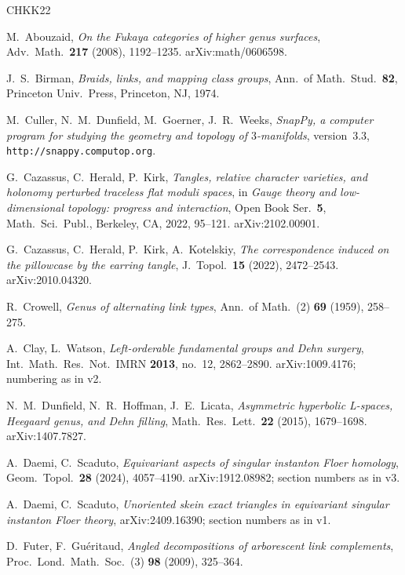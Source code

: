 \documentclass[11pt,reqno]{amsart}
\theoremstyle{plain}
\theoremstyle{definition}
\numberwithin{equation}{section}
\begin{document}
\begin{thebibliography}{CHKK22}

 M.~Abouzaid, \emph{On the Fukaya categories of higher genus surfaces},
Adv.\ Math.\ \textbf{217} (2008), 1192--1235. arXiv:math/0606598.

 J.~S.~Birman, \emph{Braids, links, and mapping class groups}, Ann.\ of Math.\ Stud.\
\textbf{82}, Princeton Univ.\ Press, Princeton, NJ, 1974.

 M.~Culler, N.~M.~Dunfield, M.~Goerner, J.~R.~Weeks, \emph{SnapPy, a
computer program for studying the geometry and topology of $3$-manifolds}, version~3.3,
\texttt{http://snappy.computop.org}.

 G.~Cazassus, C.~Herald, P.~Kirk, \emph{Tangles, relative character varieties, and holonomy
perturbed traceless flat moduli spaces}, in \emph{Gauge theory and low-dimensional topology: progress and
interaction}, Open Book Ser.\ \textbf{5}, Math.\ Sci.\ Publ., Berkeley, CA, 2022, 95--121. arXiv:2102.00901.

 G.~Cazassus, C.~Herald, P.~Kirk, A.~Kotelskiy, \emph{The correspondence induced on the
pillowcase by the earring tangle}, J.\ Topol.\ \textbf{15} (2022), 2472--2543. arXiv:2010.04320.

 R.~Crowell, \emph{Genus of alternating link types}, Ann.\ of Math.\ (2) \textbf{69}
(1959), 258--275.

 A.~Clay, L.~Watson, \emph{Left-orderable fundamental groups and Dehn surgery},
Int.\ Math.\ Res.\ Not.\ IMRN \textbf{2013}, no.~12, 2862--2890. arXiv:1009.4176; numbering as in v2.

 N.~M.~Dunfield, N.~R.~Hoffman, J.~E.~Licata, \emph{Asymmetric hyperbolic L-spaces, Heegaard
genus, and Dehn filling}, Math.\ Res.\ Lett.\ \textbf{22} (2015), 1679--1698. arXiv:1407.7827.

 A.~Daemi, C.~Scaduto, \emph{Equivariant aspects of singular instanton Floer
homology}, Geom.\ Topol.\ \textbf{28} (2024), 4057--4190. arXiv:1912.08982; section numbers as in v3.

 A.~Daemi, C.~Scaduto, \emph{Unoriented skein exact triangles in equivariant
singular instanton Floer theory}, arXiv:2409.16390; section numbers as in v1.

 D.~Futer, F.~Gu\'eritaud, \emph{Angled decompositions of arborescent link complements},
Proc.\ Lond.\ Math.\ Soc.\ (3) \textbf{98} (2009), 325--364.


\end{thebibliography}
\end{document}
